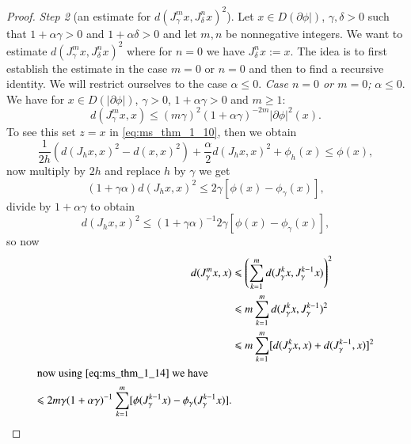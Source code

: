 \documentclass[a4paper,11pt, leqno]{scrreprt} %
\renewcommand{\leq}{\leqslant}
\renewcommand{\leq}{\leqslant}
\renewcommand{\geq}{\geqslant}
\theoremstyle{change}
\theoremstyle{nonumberplain}
\newtheorem{proof}{Proof}
\begin{document}
\begin{proof}
  \textit{Step 2} (an estimate for $d(J_\gamma^m x, J_\delta^n
  x)^2$). Let $x \in D(\partial \phi|)$, $\gamma, \delta > 0$ such
  that $1 + \alpha \gamma > 0$ and $1 + \alpha \delta > 0$ and let
  $m,n$ be nonnegative integers. We want to estimate $d(J_\gamma^m x, J_\delta^n
  x)^2$ where for $n = 0$ we have $J_\delta^n x := x$. The idea is to
  first establish the estimate in the case $m = 0 $ or $n = 0$ and
  then to find a recursive identity. We will restrict ourselves to the
  case $\alpha \leq 0$. \textit{Case $n = 0$ or $m = 0$;} $\alpha \leq
  0$. We have for $x \in D(|\partial \phi|)$, $\gamma > 0$, $1 +
  \alpha \gamma > 0$ and $m \geq 1$:
  \begin{equation}
    \label{eq:ms_thm_1_14a}
    d(J_\gamma^m x, x) \leq (m \gamma)^2 (1 + \alpha \gamma)^{-2m}
    |\partial \phi|^2(x).
  \end{equation}
  To see this set $z = x$ in \eqref{eq:ms_thm_1_10}, then we obtain
  \begin{equation}
    \label{eq:ms_thm_1_14b}
    \frac1{2h} (d(J_h x, x)^2 - d(x, x)^2) + \frac\alpha2 d(J_h x,
    x)^2 + \phi_h(x) \leq \phi(x),
  \end{equation}
  now multiply by $2h$ and replace $h$ by $\gamma$ we get
  \begin{equation}
    \label{eq:ms_thm_1_14c}
    (1 + \gamma \alpha) d(J_h x, x)^2 \leq 2 \gamma [\phi(x) -
    \phi_\gamma(x)],
  \end{equation}
  divide by $1 + \alpha \gamma$ to obtain
  \begin{equation}
    \label{eq:ms_thm_1_14d}
    d(J_h x, x)^2 \leq  (1 + \gamma \alpha)^{-1} 2 \gamma [\phi(x) -
    \phi_\gamma(x)],
  \end{equation}
  so now
  \begin{equation}
    \label{eq:ms_thm_1_15}
    \begin{split}
      d(J_\gamma^m x, x) &\leq \left ( \sum_{k = 1}^m d(J_\gamma^k x,
        J_\gamma^{k - 1} x) \right )^2\\
      &\leq m \sum_{k = 1}^m d(J_\gamma^k x, J_\gamma^{k - 1})^2\\
      &\leq m \sum_{k = 1}^m [d(J_\gamma^k x, x) + d(J_\gamma^{k - 1},
      x)]^2\\
      \shortintertext{now using \eqref{eq:ms_thm_1_14} we have}
      \leq 2 m \gamma (1 + \alpha \gamma)^{-1} \sum_{k = 1}^m
      [\phi(J_\gamma^{k - 1} x) - \phi_\gamma(J_\gamma^{k - 1} x)].
    \end{split}
  \end{equation}

\end{proof}
\end{document}
